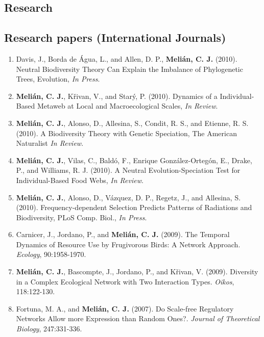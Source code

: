 \documentclass[12pt]{article}
\begin{document}
\begin{flushleft}
\section{Research}


\subsection{Research papers (International Journals)}

\begin{enumerate}
\item Davis, J., Borda de \'Agua, L., and Allen, D. P., {\bf Meli\'an,
    C. J.} (2010). Neutral Biodiversity Theory Can Explain the
  Imbalance of Phylogenetic Trees, Evolution, {\em In Press}.
\item {\bf Meli\'an, C. J.}, K\v{r}ivan, V., and Star\'y,
  P. (2010). Dynamics of a Individual-Based Metaweb at Local and Macroecological Scales,
  {\em In Review}.
\item {\bf Meli\'an, C. J.}, Alonso, D., Allesina, S., Condit, R. S.,
  and Etienne, R. S. (2010). A Biodiversity Theory with Genetic
  Speciation, The American Naturalist {\em In Review}.
\item {\bf Meli\'an, C. J.}, Vilas, C., Bald\'o, F., Enrique
  Gonz\'alez-Orteg\'on, E., Drake, P., and Williams, R. J. (2010). A
  Neutral Evolution-Speciation Test for Individual-Based Food Webs,
  {\em In Review}.
\item {\bf Meli\'an, C. J.}, Alonso, D., V\'azquez, D. P., Regetz, J.,
  and Allesina, S. (2010). Frequency-dependent Selection Predicts
  Patterns of Radiations and Biodiversity, PLoS
    Comp. Biol., {\em In Press}.
\item Carnicer, J., Jordano, P., and {\bf Meli\'an, C. J.} (2009). The Temporal Dynamics of Resource Use by Frugivorous Birds: A Network Approach. {\em Ecology}, 90:1958-1970.\\
\item {\bf Meli\'an, C. J.}, Bascompte, J., Jordano, P., and K\v{r}ivan, V. (2009). Diversity in a Complex Ecological Network with Two Interaction Types. {\em Oikos}, 118:122-130.\\
\item Fortuna, M. A., and {\bf Meli\'an, C. J.} (2007). Do Scale-free Regulatory Networks Allow more Expression than Random Ones?. {\em Journal of Theoretical Biology}, 247:331-336.\\

\end{enumerate}
\end{flushleft}
\end{document}
